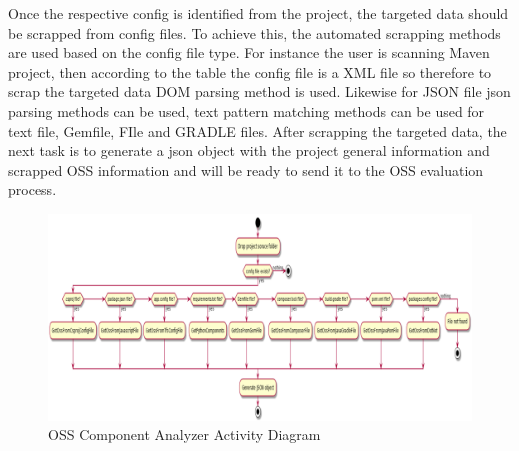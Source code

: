 Once the respective config is identified from the project, the targeted data should be scrapped from config files. To achieve this, the automated scrapping methods are used based on the config file type. For instance the user is scanning Maven project, then according to the table the config file is a XML file so therefore to scrap the targeted data DOM parsing method is used. Likewise for JSON file json parsing methods can be used, text pattern matching methods can be used for text file, Gemfile, FIle and GRADLE files. After scrapping the targeted data, the next task is to generate a json object with the project general information and scrapped OSS information and will be ready to send it to the OSS evaluation process. 
\newpage
 \begin{figure}[h!]
	\includegraphics[width=15cm]{includes/OSS_Analyzer_Activity_Diagram.png}
	\centering
	\caption{\acs{OSS} Component Analyzer Activity Diagram}
	\label{fig:Analyzer_Activity_Diagram}
\end{figure}
